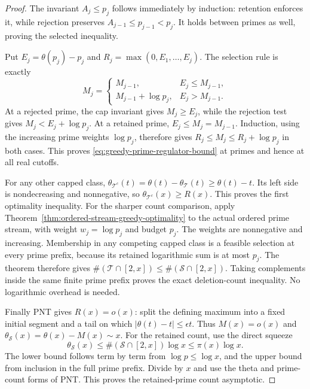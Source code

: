 \documentclass[11pt]{article}
\theoremstyle{definition}
\begin{document}
\begin{proof}
The invariant $A_j\le p_j$ follows immediately by induction:
retention enforces it, while rejection preserves $A_{j-1}\le p_{j-1}<p_j$.
It holds between primes as well, proving the selected inequality.

Put $E_j=\theta(p_j)-p_j$ and
$R_j=\max(0,E_1,\ldots,E_j)$. The selection rule is exactly
\begin{equation}
 M_j=
 \begin{cases}
 M_{j-1},&E_j\le M_{j-1},\\
 M_{j-1}+\log p_j,&E_j>M_{j-1}.
 \end{cases}
 \label{eq:greedy-prime-exact-recursion}
\end{equation}
At a rejected prime, the cap invariant gives
$M_j\ge E_j$, while the rejection test gives
$M_j<E_j+\log p_j$. At a retained prime,
$E_j\le M_j=M_{j-1}$. Induction, using the increasing prime
weights $\log p_j$, therefore gives
$R_j\le M_j\le R_j+\log p_j$ in both cases.
This proves \eqref{eq:greedy-prime-regulator-bound} at primes
and hence at all real cutoffs.

For any other capped class,
$\theta_{\mathcal T^c}(t)=\theta(t)-\theta_{\mathcal T}(t)
\ge\theta(t)-t$. Its left side is nondecreasing and nonnegative,
so $\theta_{\mathcal T^c}(x)\ge R(x)$.
This proves the first optimality inequality.
For the sharper count comparison, apply
Theorem~\ref{thm:ordered-stream-greedy-optimality} to the actual
ordered prime stream, with weight $w_j=\log p_j$ and budget $p_j$.
The weights are nonnegative and increasing. Membership in any
competing capped class is a feasible selection at every prime
prefix, because its retained logarithmic sum is at most $p_j$.
The theorem therefore gives
$\#(\mathcal T\cap[2,x])\le\#(\mathcal S\cap[2,x])$.
Taking complements inside the same finite prime prefix proves
the exact deletion-count inequality. No logarithmic overhead
is needed.

Finally PNT gives $R(x)=o(x)$: split the defining maximum
into a fixed initial segment and a tail on which
$|\theta(t)-t|\le\epsilon t$.
Thus $M(x)=o(x)$ and $\theta_{\mathcal S}(x)=\theta(x)-M(x)\sim x$.
For the retained count, use the direct squeeze
\[
 \theta_{\mathcal S}(x)
 \le \#(\mathcal S\cap[2,x])\log x
 \le \pi(x)\log x .
\]
The lower bound follows term by term from $\log p\le\log x$,
and the upper bound from inclusion in the full prime prefix.
Divide by $x$ and use the theta and prime-count forms of PNT.
This proves the retained-prime count asymptotic.
\end{proof}
\end{document}
